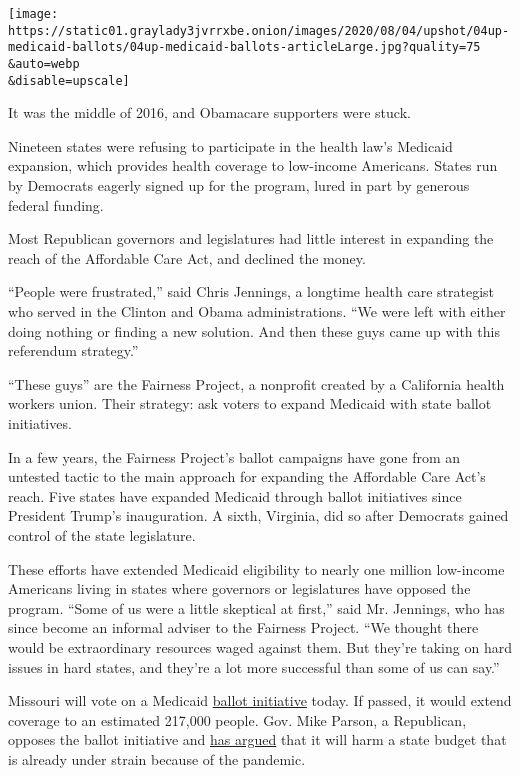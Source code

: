 \texttt{[image: https://static01.graylady3jvrrxbe.onion/images/2020/08/04/upshot/04up-medicaid-ballots/04up-medicaid-ballots-articleLarge.jpg?quality=75\\\&auto=webp\\\&disable=upscale]}

It was the middle of 2016, and Obamacare supporters were stuck.

Nineteen states were refusing to participate in the health law's
Medicaid expansion, which provides health coverage to low-income
Americans. States run by Democrats eagerly signed up for the program,
lured in part by generous federal funding.

Most Republican governors and legislatures had little interest in
expanding the reach of the Affordable Care Act, and declined the money.

``People were frustrated,'' said Chris Jennings, a longtime health care
strategist who served in the Clinton and Obama administrations. ``We
were left with either doing nothing or finding a new solution. And then
these guys came up with this referendum strategy.''

``These guys'' are the Fairness Project, a nonprofit created by a
California health workers union. Their strategy: ask voters to expand
Medicaid with state ballot initiatives.

In a few years, the Fairness Project's ballot campaigns have gone from
an untested tactic to the main approach for expanding the Affordable
Care Act's reach. Five states have expanded Medicaid through ballot
initiatives since President Trump's inauguration. A sixth, Virginia, did
so after Democrats gained control of the state legislature.

These efforts have extended Medicaid eligibility to nearly one million
low-income Americans living in states where governors or legislatures
have opposed the program. ``Some of us were a little skeptical at
first,'' said Mr. Jennings, who has since become an informal adviser to
the Fairness Project. ``We thought there would be extraordinary
resources waged against them. But they're taking on hard issues in hard
states, and they're a lot more successful than some of us can say.''

Missouri will vote on a Medicaid
\href{https://ballotpedia.org/Missouri_Amendment_2,_Medicaid_Expansion_Initiative_(August_2020)}{ballot
initiative} today. If passed, it would extend coverage to an estimated
217,000 people. Gov. Mike Parson, a Republican, opposes the ballot
initiative and
\href{https://www.kshb.com/news/local-news/missouri-medicaid-expansion-set-for-august-election}{has
argued} that it will harm a state budget that is already under strain
because of the pandemic.

